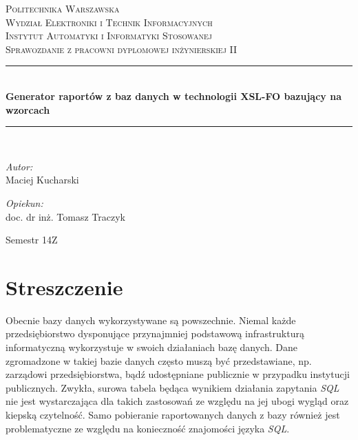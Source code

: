\documentclass[11pt,a4paper]{article}
\newcommand{\HRule}{\rule{\linewidth}{0.5mm}}
\begin{document}
\begin{titlepage}
\begin{center}
\textsc{\LARGE Politechnika Warszawska}\\[0.5cm]
\textsc{\Large Wydział Elektroniki i Technik Informacyjnych}\\
\textsc{\Large Instytut Automatyki i Informatyki Stosowanej}\\[1.5cm]

\textsc{\Large Sprawozdanie z pracowni dyplomowej inżynierskiej II} \\[0.5cm]
\HRule \\[0.4cm]
{ \huge \bfseries Generator raportów z baz danych w technologii XSL-FO  bazujący na wzorcach \\[0.4cm]}
\HRule \\[1.5cm]

\begin{minipage} {0.4\textwidth}
\begin{flushleft} \large
\emph{Autor:}\\
 Maciej Kucharski 
\end{flushleft}
\end{minipage}
\begin{minipage} {0.4\textwidth}
\begin{flushright} \large

\emph{Opiekun:}\\
doc. dr inż. Tomasz Traczyk

\end{flushright}
\end{minipage}	
\vfill
\large Semestr 14Z

	\end{center}
\end{titlepage}
 

\newpage

\section{Streszczenie} \label{sec:wst}
Obecnie bazy danych wykorzystywane są powszechnie. Niemal każde przedsiębiorstwo dysponujące przynajmniej podstawową infrastrukturą informatyczną wykorzystuje w swoich działaniach bazę danych. Dane zgromadzone w takiej bazie danych często muszą być przedstawiane, np. zarządowi przedsiębiorstwa, bądź udostępniane publicznie w przypadku instytucji publicznych. Zwykła, surowa tabela będąca wynikiem działania zapytania \emph{SQL} nie jest wystarczająca dla takich zastosowań ze względu na jej ubogi wygląd oraz kiepską czytelność.  Samo pobieranie raportowanych danych z bazy również jest problematyczne ze względu na konieczność znajomości języka \emph{SQL}. 
\end{document}

